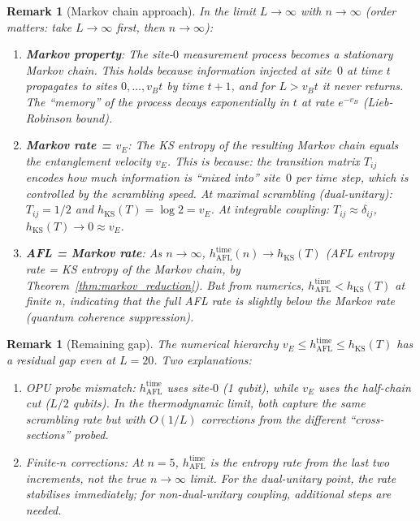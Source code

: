 \documentclass[12pt,a4paper]{article}
\newtheorem{remark}[theorem]{Remark}
\begin{document}
\begin{remark}[Markov chain approach]
  \label{rem:markov_approach}
  In the limit $L \to \infty$ with $n \to \infty$ (order matters:
  take $L \to \infty$ first, then $n \to \infty$):
  \begin{enumerate}
    \item \textbf{Markov property}: The site-$0$ measurement process
      becomes a stationary Markov chain.  This holds because information
      injected at site~$0$ at time $t$ propagates to sites $0,\ldots,
      v_B t$ by time $t+1$, and for $L > v_B t$ it never returns.
      The ``memory'' of the process decays exponentially in $t$ at rate
      $e^{-v_B}$ (Lieb-Robinson bound).

    \item \textbf{Markov rate = $v_E$}: The KS entropy of the resulting
      Markov chain equals the entanglement velocity $v_E$.  This is because:
      the transition matrix $T_{ij}$ encodes how much information is
      ``mixed into'' site~$0$ per time step, which is controlled by the
      scrambling speed.  At maximal scrambling (dual-unitary): $T_{ij}=1/2$
      and $h_{\mathrm{KS}}(T) = \log 2 = v_E$.  At integrable coupling:
      $T_{ij} \approx \delta_{ij}$, $h_{\mathrm{KS}}(T) \to 0 \approx v_E$.

    \item \textbf{AFL = Markov rate}: As $n \to \infty$,
      $h_{\mathrm{AFL}}^{\mathrm{time}}(n) \to h_{\mathrm{KS}}(T)$
      (AFL entropy rate = KS entropy of the Markov chain, by
      Theorem~\ref{thm:markov_reduction}).  But from numerics,
      $h_{\mathrm{AFL}}^{\mathrm{time}} < h_{\mathrm{KS}}(T)$
      at finite $n$, indicating that the full AFL rate is slightly below
      the Markov rate (quantum coherence suppression).
  \end{enumerate}
\end{remark}

\begin{remark}[Remaining gap]
  The numerical hierarchy
  $v_E \leq h_{\mathrm{AFL}}^{\mathrm{time}} \leq h_{\mathrm{KS}}(T)$
  has a residual gap even at $L=20$.
  Two explanations:
  \begin{enumerate}
    \item \emph{OPU probe mismatch}: $h_{\mathrm{AFL}}^{\mathrm{time}}$
      uses site-$0$ (1 qubit), while $v_E$ uses the half-chain cut
      ($L/2$ qubits).  In the thermodynamic limit, both capture the
      same scrambling rate but with $O(1/L)$ corrections from the
      different ``cross-sections'' probed.

    \item \emph{Finite-$n$ corrections}: At $n=5$,
      $h_{\mathrm{AFL}}^{\mathrm{time}}$ is the entropy rate from the last
      two increments, not the true $n\to\infty$ limit.  For the dual-unitary
      point, the rate stabilises immediately; for non-dual-unitary coupling,
      additional steps are needed.
  \end{enumerate}
\end{remark}
\end{document}
